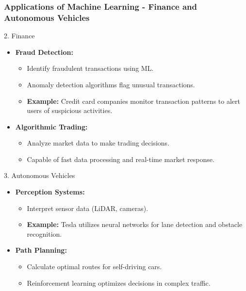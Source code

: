 \documentclass[aspectratio=169]{beamer}
\begin{document}
\begin{frame}[fragile]
    \frametitle{Applications of Machine Learning - Finance and Autonomous Vehicles}
    \begin{block}{2. Finance}
        \begin{itemize}
            \item \textbf{Fraud Detection:}
            \begin{itemize}
                \item Identify fraudulent transactions using ML.
                \item Anomaly detection algorithms flag unusual transactions.
                \item \textbf{Example:} Credit card companies monitor transaction patterns to alert users of suspicious activities.
            \end{itemize}
            
            \item \textbf{Algorithmic Trading:}
            \begin{itemize}
                \item Analyze market data to make trading decisions.
                \item Capable of fast data processing and real-time market response.
            \end{itemize}
        \end{itemize}
    \end{block}
    
    \begin{block}{3. Autonomous Vehicles}
        \begin{itemize}
            \item \textbf{Perception Systems:}
            \begin{itemize}
                \item Interpret sensor data (LiDAR, cameras).
                \item \textbf{Example:} Tesla utilizes neural networks for lane detection and obstacle recognition.
            \end{itemize}
            
            \item \textbf{Path Planning:}
            \begin{itemize}
                \item Calculate optimal routes for self-driving cars.
                \item Reinforcement learning optimizes decisions in complex traffic.
            \end{itemize}
        \end{itemize}
    \end{block}
\end{frame}
\end{document}
